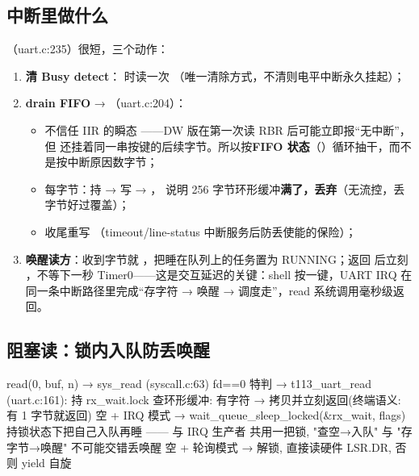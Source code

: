 \subsection{中断里做什么}

（uart.c:235）很短，三个动作：

\begin{enumerate}
  \item \textbf{清 Busy detect}： 时读一次 （唯一清除方式，不清则电平中断永久挂起）；
  \item \textbf{drain FIFO} → （uart.c:204）：
    \begin{itemize}
      \item 不信任 IIR 的瞬态 ——DW 版在第一次读 RBR 后可能立即报``无中断''，但  还挂着同一串按键的后续字节。所以按\textbf{FIFO 状态}（）循环抽干，而不是按中断原因数字节；
      \item 每字节：持  → 写  → ， 说明 256 字节环形缓冲\textbf{满了，丢弃}（无流控，丢字节好过覆盖）；
      \item 收尾重写 （timeout/line-status 中断服务后防丢使能的保险）；
    \end{itemize}
  \item \textbf{唤醒读方}：收到字节就 ，把睡在队列上的任务置为 RUNNING；返回  后立刻 ，不等下一秒 Timer0——这是交互延迟的关键：shell 按一键，UART IRQ 在同一条中断路径里完成``存字符 → 唤醒 → 调度走''，read 系统调用毫秒级返回。
\end{enumerate}

\subsection{阻塞读：锁内入队防丢唤醒}

\begin{txtcode}
read(0, buf, n) → sys_read (syscall.c:63)  fd==0 特判
  → t113_uart_read (uart.c:161):
      持 rx_wait.lock 查环形缓冲:
        有字符 → 拷贝并立刻返回(终端语义: 有 1 字节就返回)
        空 + IRQ 模式 → wait_queue_sleep_locked(&rx_wait, flags)
                         持锁状态下把自己入队再睡 —— 与 IRQ 生产者
                         共用一把锁, "查空→入队" 与 "存字节→唤醒"
                         不可能交错丢唤醒
        空 + 轮询模式 → 解锁, 直接读硬件 LSR.DR, 否则 yield 自旋
\end{txtcode}

